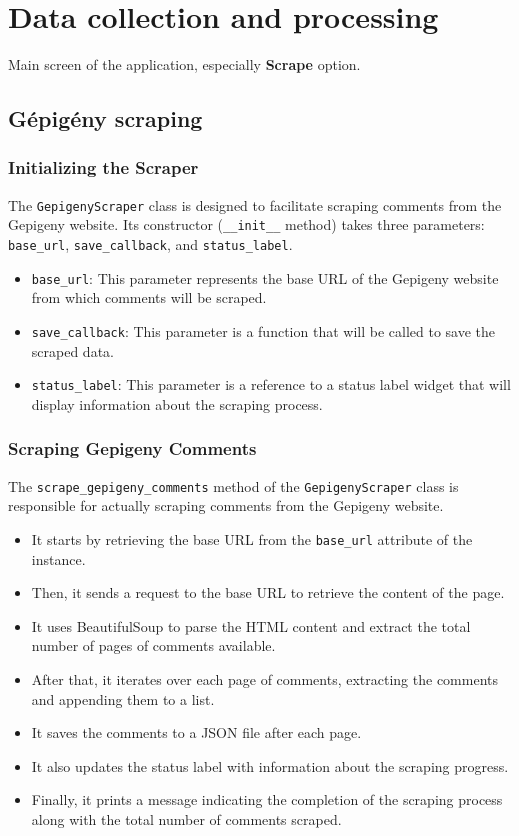 \section{Data collection and processing}
Main screen of the application, especially \textbf{Scrape} option.

\subsection{Gépigény scraping}
\subsubsection*{Initializing the Scraper}
The \texttt{GepigenyScraper} class is designed to facilitate scraping comments from the Gepigeny website. Its constructor (\texttt{\_\_init\_\_} method) takes three parameters: \texttt{base\_url}, \texttt{save\_callback}, and \texttt{status\_label}. 

\begin{itemize}
    \item \texttt{base\_url}: This parameter represents the base URL of the Gepigeny website from which comments will be scraped.
    \item \texttt{save\_callback}: This parameter is a function that will be called to save the scraped data.
    \item \texttt{status\_label}: This parameter is a reference to a status label widget that will display information about the scraping process.
\end{itemize}

\subsubsection*{Scraping Gepigeny Comments}
The \texttt{scrape\_gepigeny\_comments} method of the \texttt{GepigenyScraper} class is responsible for actually scraping comments from the Gepigeny website.

\begin{itemize}
    \item It starts by retrieving the base URL from the \texttt{base\_url} attribute of the instance.
    \item Then, it sends a request to the base URL to retrieve the content of the page.
    \item It uses BeautifulSoup to parse the HTML content and extract the total number of pages of comments available.
    \item After that, it iterates over each page of comments, extracting the comments and appending them to a list.
    \item It saves the comments to a JSON file after each page.
    \item It also updates the status label with information about the scraping progress.
    \item Finally, it prints a message indicating the completion of the scraping process along with the total number of comments scraped.
\end{itemize}

